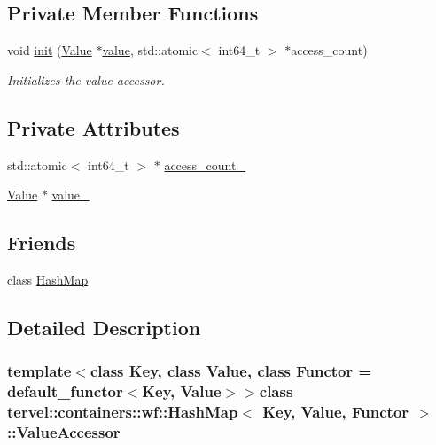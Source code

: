 \subsection*{Private Member Functions}
\begin{DoxyCompactItemize}
\item 
void \hyperlink{classtervel_1_1containers_1_1wf_1_1_hash_map_1_1_value_accessor_a44db31fa9f2364a0dddf193dcd3e0c72}{init} (\hyperlink{hash__map_2test_object_8h_ad777bf08d8e2b01df17ba5e3c51ae11f}{Value} $\ast$\hyperlink{classtervel_1_1containers_1_1wf_1_1_hash_map_1_1_value_accessor_a54f9f278457daf02a4e140cbe053643b}{value}, std\+::atomic$<$ int64\+\_\+t $>$ $\ast$access\+\_\+count)
\begin{DoxyCompactList}\small\item\em Initializes the value accessor. \end{DoxyCompactList}\end{DoxyCompactItemize}
\subsection*{Private Attributes}
\begin{DoxyCompactItemize}
\item 
std\+::atomic$<$ int64\+\_\+t $>$ $\ast$ \hyperlink{classtervel_1_1containers_1_1wf_1_1_hash_map_1_1_value_accessor_a618a0a94c509bc451fd63cf0687ca527}{access\+\_\+count\+\_\+}
\item 
\hyperlink{hash__map_2test_object_8h_ad777bf08d8e2b01df17ba5e3c51ae11f}{Value} $\ast$ \hyperlink{classtervel_1_1containers_1_1wf_1_1_hash_map_1_1_value_accessor_a75ab81c8fa2032a5a4a9dff43227c387}{value\+\_\+}
\end{DoxyCompactItemize}
\subsection*{Friends}
\begin{DoxyCompactItemize}
\item 
class \hyperlink{classtervel_1_1containers_1_1wf_1_1_hash_map_1_1_value_accessor_ab6054287e6f409207af3fa16e49046ad}{Hash\+Map}
\end{DoxyCompactItemize}


\subsection{Detailed Description}
\subsubsection*{template$<$class Key, class Value, class Functor = default\+\_\+functor$<$\+Key, Value$>$$>$class tervel\+::containers\+::wf\+::\+Hash\+Map$<$ Key, Value, Functor $>$\+::\+Value\+Accessor}

